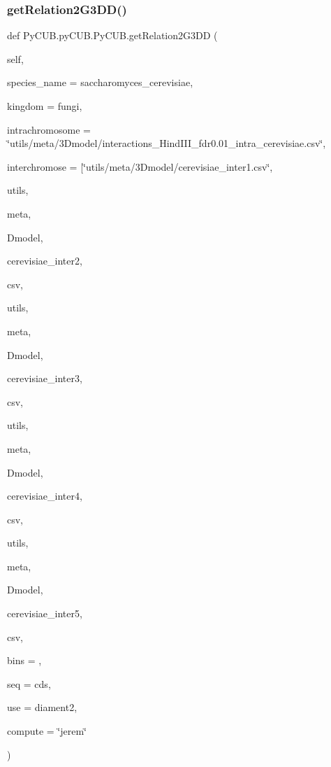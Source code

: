 \subsubsection{\texorpdfstring{get\+Relation2\+G3\+D\+D()}{getRelation2G3DD()}}
{\footnotesize\ttfamily def Py\+C\+U\+B.\+py\+C\+U\+B.\+Py\+C\+U\+B.\+get\+Relation2\+G3\+DD (\begin{DoxyParamCaption}\item[{}]{self,  }\item[{}]{species\+\_\+name = {\ttfamily \textquotesingle{}saccharomyces\+\_\+cerevisiae\textquotesingle{}},  }\item[{}]{kingdom = {\ttfamily \textquotesingle{}fungi\textquotesingle{}},  }\item[{}]{intrachromosome = {\ttfamily \char`\"{}utils/meta/3Dmodel/interactions\+\_\+HindIII\+\_\+fdr0.01\+\_\+intra\+\_\+cerevisiae.csv\char`\"{}},  }\item[{}]{interchromose = {\ttfamily \mbox{[}\char`\"{}utils/meta/3Dmodel/cerevisiae\+\_\+inter1.csv\char`\"{}},  }\item[{}]{utils,  }\item[{}]{meta,  }\item[{}]{Dmodel,  }\item[{}]{cerevisiae\+\_\+inter2,  }\item[{}]{csv,  }\item[{}]{utils,  }\item[{}]{meta,  }\item[{}]{Dmodel,  }\item[{}]{cerevisiae\+\_\+inter3,  }\item[{}]{csv,  }\item[{}]{utils,  }\item[{}]{meta,  }\item[{}]{Dmodel,  }\item[{}]{cerevisiae\+\_\+inter4,  }\item[{}]{csv,  }\item[{}]{utils,  }\item[{}]{meta,  }\item[{}]{Dmodel,  }\item[{}]{cerevisiae\+\_\+inter5,  }\item[{}]{csv,  }\item[{}]{bins = {},  }\item[{}]{seq = {\ttfamily \textquotesingle{}cds\textquotesingle{}},  }\item[{}]{use = {\ttfamily \textquotesingle{}diament2\textquotesingle{}},  }\item[{}]{compute = {\ttfamily \char`\"{}jerem\char`\"{}} }\end{DoxyParamCaption})}



